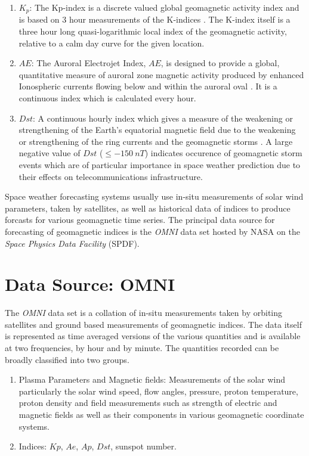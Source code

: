 \documentclass{article}
\begin{document}
\begin{enumerate}
    \item $K_p$: The Kp-index is a discrete valued global geomagnetic activity index and is based on 3 hour measurements of the K-indices \citep{Bartels}. The K-index itself is a three hour long quasi-logarithmic local index of the geomagnetic activity, relative to a calm day curve for the given location.
    
    \item $AE$: The Auroral Electrojet Index, $AE$, is designed to provide a global, quantitative measure of auroral zone magnetic activity produced by enhanced Ionospheric currents flowing below and within the auroral oval \citep{AEIndex}. It is a continuous index which is calculated every hour.
    
    \item $Dst$: A continuous hourly index which gives a measure of the weakening or strengthening of the Earth's equatorial magnetic field due to the weakening or strengthening of the ring currents and the geomagnetic storms \citep{DesslerAndParker}. A large negative value of $Dst$ ($ \leq -150 \ nT$) indicates occurence of geomagnetic storm events which are of particular importance in space weather prediction due to their effects on telecommunications infrastructure. 
\end{enumerate}

Space weather forecasting systems usually use in-situ measurements of solar wind parameters, taken by satellites, as well as historical data of indices to produce forcasts for various geomagnetic time series. The principal data source for forecasting of geomagnetic indices is the \emph{OMNI} data set hosted by NASA on the \emph{Space Physics Data Facility} (SPDF).

\section{Data Source: OMNI}
The \emph{OMNI} data set is a collation of in-situ measurements taken by orbiting satellites and ground based measurements of geomagnetic indices. The data itself is represented as time averaged versions of the various quantities and is available at two frequencies, by hour and by minute. The quantities recorded can be broadly classified into two groups.

\begin{enumerate}

  \item Plasma Parameters and Magnetic fields: Measurements of the solar wind particularly the solar wind speed, flow angles, pressure, proton temperature, proton density and field measurements such as strength of electric and magnetic fields as well as their components in various geomagnetic coordinate systems.
  
  \item Indices: $Kp$, $Ae$, $Ap$, $Dst$, sunspot number.
  
\end{enumerate}
\end{document}
